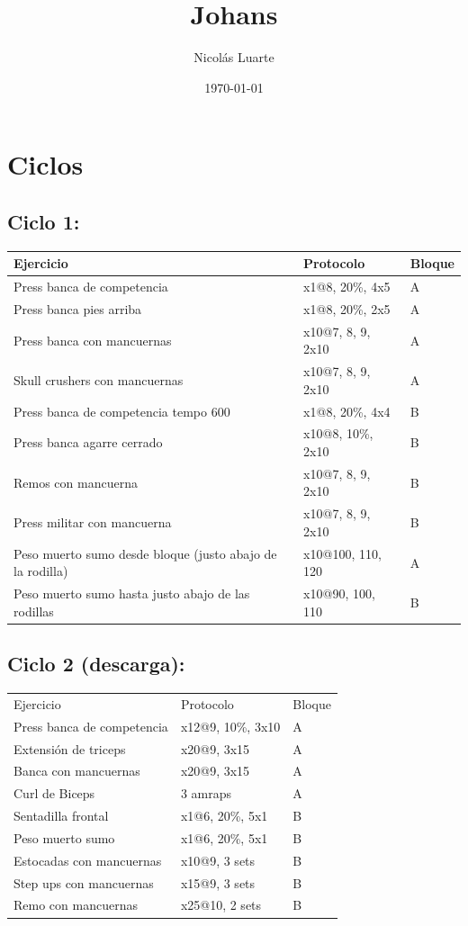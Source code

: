 \documentclass[11pt]{article}
\author{Nicolás Luarte}
\date{\today}
\title{Johans}
\begin{document}
\maketitle
\tableofcontents

\section{Ciclos}
\label{sec:org2b8316d}
\subsection{Ciclo 1:}
\label{sec:orgc175aeb}
\begin{center}
\begin{tabular}{lll}
\hline
Ejercicio & Protocolo & Bloque\\
\hline
Press banca de competencia & x1@8, 20\%, 4x5 & A\\
Press banca pies arriba & x1@8, 20\%, 2x5 & A\\
Press banca con mancuernas & x10@7, 8, 9, 2x10 & A\\
Skull crushers con mancuernas & x10@7, 8, 9, 2x10 & A\\
\hline
Press banca de competencia tempo 600 & x1@8, 20\%, 4x4 & B\\
Press banca agarre cerrado & x10@8, 10\%, 2x10 & B\\
Remos con mancuerna & x10@7, 8, 9, 2x10 & B\\
Press militar con mancuerna & x10@7, 8, 9, 2x10 & B\\
\hline
Peso muerto sumo desde bloque (justo abajo de la rodilla) & x10@100, 110, 120 & A\\
Peso muerto sumo hasta justo abajo de las rodillas & x10@90, 100, 110 & B\\
\hline
\end{tabular}
\end{center}

\subsection{Ciclo 2 (descarga):}
\label{sec:org06a5d70}
\begin{center}
\begin{tabular}{lll}
\hline
Ejercicio & Protocolo & Bloque\\
Press banca de competencia & x12@9, 10\%, 3x10 & A\\
Extensión de triceps & x20@9, 3x15 & A\\
Banca con mancuernas & x20@9, 3x15 & A\\
Curl de Biceps & 3 amraps & A\\
\hline
Sentadilla frontal & x1@6, 20\%, 5x1 & B\\
Peso muerto sumo & x1@6, 20\%, 5x1 & B\\
Estocadas con mancuernas & x10@9, 3 sets & B\\
Step ups con mancuernas & x15@9, 3 sets & B\\
Remo con mancuernas & x25@10, 2 sets & B\\
\hline
\end{tabular}
\end{center}
\end{document}
